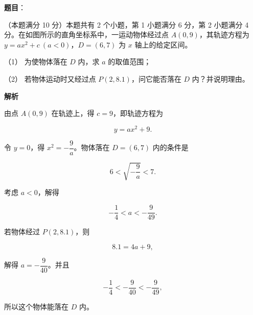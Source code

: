 \begin{answer}

\textbf{题目}：

（本题满分 10 分）本题共有 2 个小题，第 1 小题满分 6 分，第 2 小题满分 4 分。在如图所示的直角坐标系中，一运动物体经过点 $A(0,9)$，其轨迹方程为 $y=ax^2+c\ (a<0)$，$D=(6,7)$ 为 $x$ 轴上的给定区间。

（1） 为使物体落在 $D$ 内，求 $a$ 的取值范围；

（2） 若物体运动时又经过点 $P(2,8.1)$，问它能否落在 $D$ 内？并说明理由。
\nopagebreak[4]
\begin{center}\end{center}
\nopagebreak[4]
\textbf{解析}


由点 $A(0,9)$ 在轨迹上，得 $c=9$，即轨迹方程为

\nopagebreak[4]
\[
y=ax^2+9.
\]

令 $y=0$，得 $x^2=-\dfrac9a$。物体落在 $D=(6,7)$ 内的条件是

\nopagebreak[4]
\[
6<\sqrt{-\dfrac9a}<7.
\]

考虑 $a<0$，解得

\nopagebreak[4]
\[
-\dfrac14<a<-\dfrac9{49}.
\]


若物体经过 $P(2,8.1)$，则

\nopagebreak[4]
\[
8.1=4a+9,
\]

解得 $a=-\dfrac9{40}$。并且

\nopagebreak[4]
\[
-\dfrac14<-\dfrac9{40}<-\dfrac9{49},
\]

所以这个物体能落在 $D$ 内。



\end{answer}

